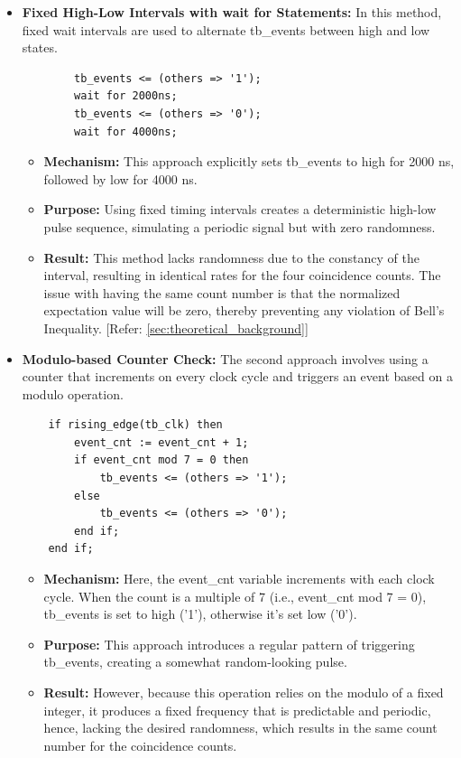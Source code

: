 \begin{itemize}
	\item \textbf{Fixed High-Low Intervals with wait for Statements: }
	In this method, fixed wait intervals are used to alternate tb\_events between high and low states.
	
	\begin{lstlisting}
		tb_events <= (others => '1');
		wait for 2000ns;
		tb_events <= (others => '0');
		wait for 4000ns;		
	\end{lstlisting}
	
	\begin{itemize}
		\item [$\rightarrow$] \textbf{Mechanism: } This approach explicitly sets tb\_events to high for 2000 ns, followed by low for 4000 ns.
		\item [$\rightarrow$] \textbf{Purpose: }  Using fixed timing intervals creates a deterministic high-low pulse sequence, simulating a periodic signal but with zero randomness.
		\item [$\rightarrow$] \textbf{Result: } This method lacks randomness due to the constancy of the interval, resulting in identical rates for the four coincidence counts. The issue with having the same count number is that the normalized expectation value will be zero, thereby preventing any violation of Bell's Inequality. [Refer: \ref{sec:theoretical_background}]
	\end{itemize}
	
	\item \textbf{Modulo-based Counter Check: }
	The second approach involves using a counter that increments on every clock cycle and triggers an event based on a modulo operation.
	
	\begin{lstlisting}
	if rising_edge(tb_clk) then
		event_cnt := event_cnt + 1;
		if event_cnt mod 7 = 0 then
			tb_events <= (others => '1');
		else
			tb_events <= (others => '0');
		end if;
	end if;
	\end{lstlisting}
	
	\begin{itemize}
		\item [$\rightarrow$] \textbf{Mechanism: } 
		Here, the event\_cnt variable increments with each clock cycle. When the count is a multiple of 7 (i.e., event\_cnt mod 7 = 0), tb\_events is set to high ('1'), otherwise it’s set low ('0').
		\item [$\rightarrow$] \textbf{Purpose: }
		This approach introduces a regular pattern of triggering tb\_events, creating a somewhat random-looking pulse.
		\item [$\rightarrow$] \textbf{Result: }
		However, because this operation relies on the modulo of a fixed integer, it produces a fixed frequency that is predictable and periodic,
		hence, lacking the desired randomness, which results in the same count number for the coincidence counts.
	\end{itemize}
	

\end{itemize}
